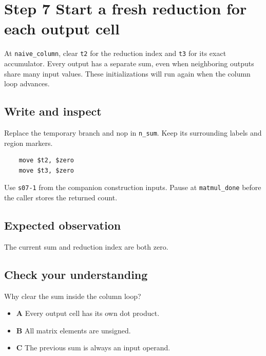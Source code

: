\section{Step 7 Start a fresh reduction for each output cell}\label{matmul-s07}

At \texttt{naive\_column}, clear \texttt{t2} for the reduction index and \texttt{t3} for its exact accumulator. Every output has a separate sum, even when neighboring outputs share many input values. These initializations will run again when the column loop advances.

\subsection{Write and inspect}
Replace the temporary branch and nop in \texttt{n\_sum}. Keep its surrounding labels and region markers.

\begin{verbatim}
    move $t2, $zero
    move $t3, $zero
\end{verbatim}
Use \texttt{s07-1} from the companion construction inputs. Pause at \texttt{matmul\_done} before the caller stores the returned count.

\subsection{Expected observation}
The current sum and reduction index are both zero.

\subsection{Check your understanding}
Why clear the sum inside the column loop?

\begin{itemize}
  \item \textbf{A} Every output cell has its own dot product.
  \item \textbf{B} All matrix elements are unsigned.
  \item \textbf{C} The previous sum is always an input operand.
\end{itemize}
